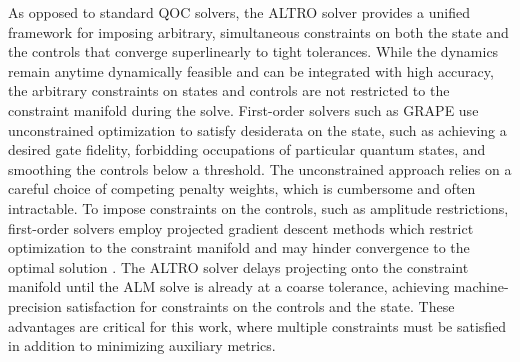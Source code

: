 As opposed to standard QOC solvers, the ALTRO solver provides a unified framework
for imposing arbitrary, simultaneous constraints
on both the state and the controls that converge superlinearly to tight tolerances. 
While the dynamics remain anytime dynamically feasible and can be integrated with high 
accuracy, the arbitrary constraints on states and controls are not restricted to the 
constraint manifold during the solve.
First-order solvers such as GRAPE
use unconstrained optimization to satisfy desiderata on the state,
such as achieving a desired gate fidelity, forbidding occupations of particular quantum states,
and smoothing the controls below a threshold. The unconstrained approach relies
on a careful choice of competing penalty weights, which is cumbersome and often intractable.
To impose constraints on the controls, such as amplitude restrictions, first-order solvers
employ projected gradient descent methods which restrict optimization to the constraint manifold and
may hinder convergence to the optimal solution \cite{clarkson2010coresets,
  hauswirth2016projected}.
The ALTRO solver delays projecting onto the constraint manifold until the ALM
solve is already at a coarse tolerance, achieving machine-precision satisfaction
for constraints on the controls and the state. These advantages are critical
for this work, where multiple constraints must be satisfied in addition
to minimizing auxiliary metrics.


